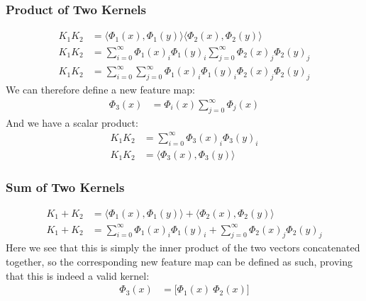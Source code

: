 \documentclass[a4paper,12pt]{article}
\begin{document}
\subsubsection*{Product of Two Kernels}

\begin{align*}
K_1K_2 &= \langle \Phi_1(x), \Phi_1(y) \rangle \langle \Phi_2(x), \Phi_2(y) \rangle \\
K_1K_2 &= \sum_{i=0}^{\infty} \Phi_1(x)_i\Phi_1(y)_i \sum_{j=0}^{\infty} \Phi_2(x)_j\Phi_2(y)_j \\
K_1K_2 &= \sum_{i=0}^{\infty} \sum_{j=0}^{\infty} \Phi_1(x)_i\Phi_1(y)_i\Phi_2(x)_j\Phi_2(y)_j
\end{align*}
We can therefore define a new feature map:
\begin{align*}
\Phi_3(x) &= \Phi_i(x) \sum_{j=0}^{\infty} \Phi_j(x)
\end{align*}
And we have a scalar product:
\begin{align*}
K_1K_2 &= \sum_{i=0}^{\infty} \Phi_3(x)_i\Phi_3(y)_i \\
K_1K_2 &= \langle \Phi_3(x), \Phi_3(y) \rangle
\end{align*}

\subsubsection*{Sum of Two Kernels}

\begin{align*}
K_1 + K_2 &= \langle \Phi_1(x), \Phi_1(y) \rangle + \langle \Phi_2(x), \Phi_2(y) \rangle \\
K_1 + K_2 &= \sum_{i=0}^{\infty} \Phi_1(x)_i\Phi_1(y)_i + \sum_{j=0}^{\infty} \Phi_2(x)_j\Phi_2(y)_j
\end{align*}
Here we see that this is simply the inner product of the two vectors concatenated together, so the corresponding new feature map can be defined as such, proving that this is indeed a valid kernel:
\begin{align*}
\Phi_3(x) &= \big[ \Phi_1(x) \ \Phi_2(x) \big]
\end{align*}
\end{document}
